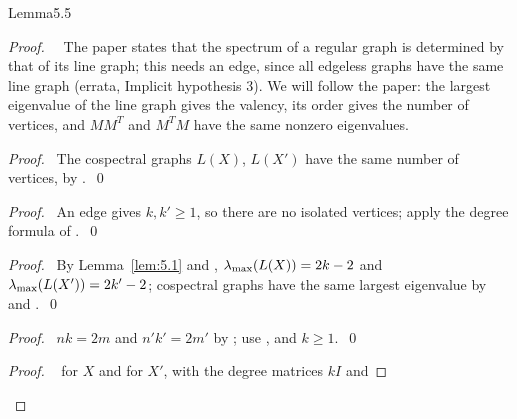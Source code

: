 \begin{cgss}{Lemma}{5.5}\label{lem:5.5}
\end{cgss}
\begin{proof}
 \pfsketch\ \repair\ The paper states that the spectrum of a regular graph is determined by that
 of its line graph; this needs an edge, since all edgeless graphs have the same line graph
 (errata, Implicit hypothesis 3). We will follow the paper: the largest eigenvalue of the line
 graph gives the valency, its order gives the number of vertices, and $MM^T$ and $M^TM$ have the
 same nonzero eigenvalues.
 \begin{proof}\pf\ The cospectral graphs $L(X)$, $L(X')$ have the same number of vertices, by
  .~\qed\end{proof}
 \begin{proof}\pf\ An edge gives $k,k'\ge1$, so there are no isolated vertices; apply the
  degree formula of .~\qed\end{proof}
 \begin{proof}\pf\ By Lemma~\ref{lem:5.1} and , $\lambda_{\max}(L(X))=2k-2$ and
  $\lambda_{\max}(L(X'))=2k'-2$; cospectral graphs have the same largest eigenvalue by
   and .~\qed\end{proof}
 \begin{proof}\pf\ $nk=2m$ and $n'k'=2m'$ by ;
  use ,  and $k\ge1$.~\qed\end{proof}
 \begin{proof}\pf\  for $X$ and for $X'$, with the degree matrices $kI$ and

\end{proof}
\end{proof}
